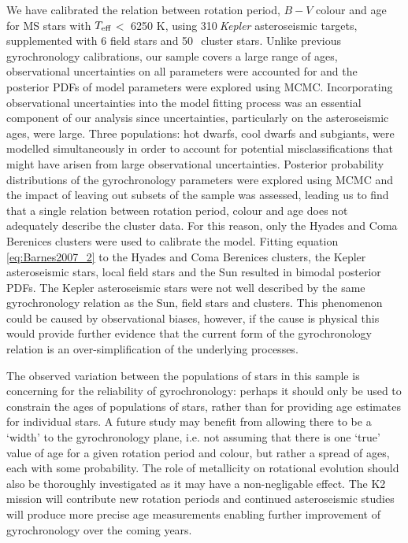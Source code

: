 \documentclass[useAMS, usenatbib]{mn2e}
\newcommand{\teff}{$T_{\rm{eff}}$}
\newcommand{\nastero}{310}
\newcommand{\nHC}{50~}
\begin{document}
We have calibrated the relation between rotation period, $B-V$ colour and age
for MS stars with \teff$<$ 6250 K, using \nastero$~${\it Kepler} asteroseismic
targets, supplemented with 6 field stars and \nHC$~$cluster stars.
Unlike previous gyrochronology calibrations, our sample covers a large range
of ages, observational uncertainties on all parameters were accounted for and
the posterior PDFs of model parameters were explored using MCMC.
Incorporating observational uncertainties into the model fitting process was
an essential component of our analysis since uncertainties, particularly on the
asteroseismic ages, were large.
Three populations: hot dwarfs, cool dwarfs and subgiants, were modelled
simultaneously in order to account for potential misclassifications that
might have arisen from large observational uncertainties.
Posterior probability distributions of the gyrochronology parameters were
explored using MCMC and the impact of leaving out subsets of the sample was
assessed, leading us to find that a single relation between rotation period,
colour and age does not adequately describe the cluster data.
For this reason, only the Hyades and Coma Berenices clusters were used to
calibrate the model.
Fitting equation \ref{eq:Barnes2007_2} to the Hyades and Coma Berenices
clusters, the Kepler asteroseismic stars, local field stars and the Sun
resulted in bimodal posterior PDFs.
The Kepler asteroseismic stars were not well described by the same
gyrochronology relation as the Sun, field stars and clusters.
This phenomenon could be caused by observational biases, however, if the cause
is physical this would provide further evidence that the current form of the
gyrochronology relation is an over-simplification of the underlying processes.

The observed variation between the populations of stars in this sample
is concerning for the reliability of gyrochronology: perhaps it should
only be used to constrain the ages of populations of stars, rather than for
providing age estimates for individual stars.
A future study may benefit from allowing there to be a `width' to the
gyrochronology plane, i.e. not assuming that there is one `true' value of age
for a given rotation period and colour, but rather a spread of ages, each with
some probability.
The role of metallicity on rotational evolution should also be thoroughly
investigated as it may have a non-negligable effect.
The K2 mission will contribute new rotation periods and continued
asteroseismic studies will produce more precise age measurements enabling
further improvement of gyrochronology over the coming years.
\end{document}
